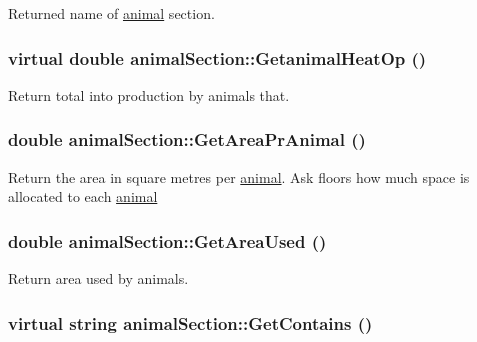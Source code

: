 Returned name of \hyperlink{classanimal}{animal} section. \hypertarget{classanimal_section_ac576524a422ea47bf04918c40d125695}{
\subsubsection[{GetanimalHeatOp}]{\setlength{\rightskip}{0pt plus 5cm}virtual double animalSection::GetanimalHeatOp ()}}
\label{classanimal_section_ac576524a422ea47bf04918c40d125695}


Return total into production by animals that. \hypertarget{classanimal_section_acedfd121b961e1b77669efc3104c125d}{
\subsubsection[{GetAreaPrAnimal}]{\setlength{\rightskip}{0pt plus 5cm}double animalSection::GetAreaPrAnimal ()}}
\label{classanimal_section_acedfd121b961e1b77669efc3104c125d}


Return the area in square metres per \hyperlink{classanimal}{animal}. Ask floors how much space is allocated to each \hyperlink{classanimal}{animal} \hypertarget{classanimal_section_a87002a34cbfb681aea527998573ae3bd}{
\subsubsection[{GetAreaUsed}]{\setlength{\rightskip}{0pt plus 5cm}double animalSection::GetAreaUsed ()}}
\label{classanimal_section_a87002a34cbfb681aea527998573ae3bd}


Return area used by animals. \hypertarget{classanimal_section_a3373b12f97678e5c8f99e0d75a501438}{
\subsubsection[{GetContains}]{\setlength{\rightskip}{0pt plus 5cm}virtual string animalSection::GetContains ()}}
\label{classanimal_section_a3373b12f97678e5c8f99e0d75a501438}


